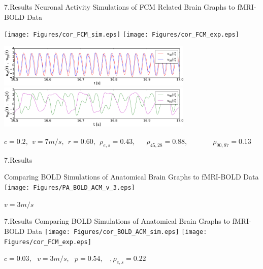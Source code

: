\documentclass{beamer}
\begin{document}
\begin{frame}{7.Results}
\footnotesize{Neuronal Activity Simulations of FCM Related Brain Graphs to fMRI-BOLD Data}

\break

	\centering
	 \texttt{[image: Figures/cor\_FCM\_sim.eps]} 
   	 \texttt{[image: Figures/cor\_FCM\_exp.eps]} 

 \includegraphics[width=0.7\textwidth]{Figures/cor_FCM_sim_no_best.eps} \\
 \includegraphics[width=0.7\textwidth]{Figures/cor_FCM_sim_no_worst.eps} 

\tiny{$c=0.2,~~ v=7 m/s, ~~ r=0.60, ~~ \rho_{e,s}=0.43$, ~~ $\rho_{45,28}=0.88$, ~~~~~~ $\rho_{90,87}=0.13$}

\end{frame}


\begin{frame}{7.Results}

\footnotesize{Comparing BOLD Simulations of Anatomical Brain Graphs to fMRI-BOLD Data} 
\break
	\centering
    \texttt{[image: Figures/PA\_BOLD\_ACM\_v\_3.eps]} 
    
 $v=3 m/s$   
    
\end{frame}



\begin{frame}{7.Results}
\footnotesize{Comparing BOLD Simulations of Anatomical Brain Graphs to fMRI-BOLD Data} 
\break
	\centering
	 \texttt{[image: Figures/cor\_BOLD\_ACM\_sim.eps]} 
   	 \texttt{[image: Figures/cor\_FCM\_exp.eps]} 

$c=0.03, ~~~ v=3 m/s, ~~~ p=0.54, ~~~~, \rho_{e,s}=0.22$

\end{frame}
\end{document}
